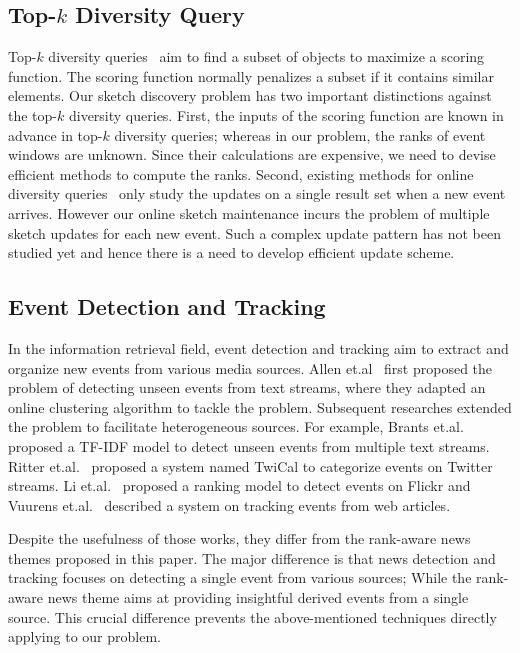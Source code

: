 \subsection{Top-$k$ Diversity Query}
Top-$k$ diversity queries~\cite{agrawal2009diversifying,borodin2012max,drosou2014diverse,chen2015diversity}
aim to find a subset of objects to maximize a scoring function. The scoring function normally penalizes
a subset if it contains similar elements. Our sketch discovery problem has two important distinctions
 against the top-$k$ diversity queries.
First, the inputs of the scoring function are known in advance in top-$k$ diversity queries; whereas in our problem, the ranks of event windows are unknown. Since their calculations are expensive, we need to devise efficient methods to compute the ranks.
Second, existing methods for online diversity queries~\cite{borodin2012max,drosou2014diverse,chen2015diversity} only study
the updates on a single result set when a new event arrives. However our online sketch maintenance 
incurs the problem of multiple sketch updates for each new event. Such a complex update pattern has not been studied yet and hence there is a need to develop efficient update scheme.

\subsection{Event Detection and Tracking}
In the information retrieval field, event detection and tracking aim to extract and organize new events from various
media sources. Allen et.al~\cite{allan1998line} first proposed the problem of detecting unseen events from text streams, where they adapted an online clustering algorithm to tackle the problem. Subsequent researches extended the problem to facilitate heterogeneous sources. For example, Brants et.al.~\cite{brants2003asystem} proposed a TF-IDF model to detect unseen events from multiple text streams. Ritter et.al.~\cite{ritter2012opendoamin} proposed a system named TwiCal to categorize events on Twitter streams. Li et.al.~\cite{li2015social} proposed a ranking model to detect events on Flickr and Vuurens et.al.~\cite{Vuurens2015Onlinenews} described a system on tracking events from web articles.

Despite the usefulness of those works, they differ from the rank-aware news themes proposed in this paper.
The major difference is that news detection and tracking focuses on detecting a single event from various sources; While
the rank-aware news theme aims at providing insightful derived events from a single source. This crucial 
difference prevents the above-mentioned techniques directly applying to our problem.

